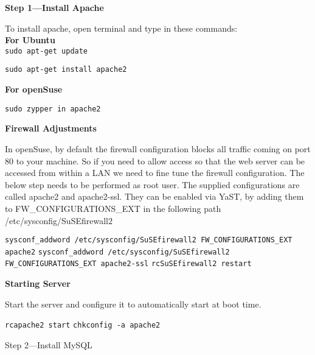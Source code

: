 \documentclass[16pt]{article}
\begin{document}
  \begin{enumerate}
  

  

  {\Large{\item{\textbf{Step 1---Install Apache}}}}
  
  \hfill

  To install apache, open terminal and type in these commands: \\
  \textbf{For Ubuntu} \\
  \texttt{sudo apt-get update} 

  \texttt{sudo apt-get install apache2}

  \textbf{For openSuse}

  \texttt{sudo zypper in apache2}

  \textbf{Firewall Adjustments}

  In openSuse, by default the firewall configuration blocks all traffic
  coming on port 80 to your machine. So if you need to allow access so
  that the web server can be accessed from within a LAN we need to fine
  tune the firewall configuration. The below step needs to be performed as
  root user. The supplied configurations are called apache2 and
  apache2-ssl. They can be enabled via YaST, by adding them to
  FW\_CONFIGURATIONS\_EXT in the following path /etc/sysconfig/SuSEfirewall2
  
  \vspace{0.5cm}

  \texttt{sysconf\_addword /etc/sysconfig/SuSEfirewall2 FW\_CONFIGURATIONS\_EXT apache2}
  \texttt{sysconf\_addword /etc/sysconfig/SuSEfirewall2 FW\_CONFIGURATIONS\_EXT apache2-ssl}
  \texttt{rcSuSEfirewall2 restart}
  
   \vspace{0.5cm}

  \textbf{Starting Server}

  Start the server and configure it to automatically start at boot time.

  \texttt{rcapache2 start} \texttt{chkconfig -a apache2}
  
   \vspace{0.5cm}

  {\Large{\item{Step 2---Install MySQL}}}
  
   \vspace{0.5cm}


\end{enumerate}
\end{document}
